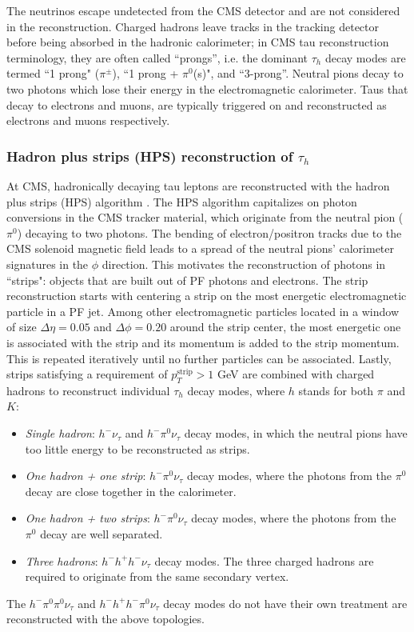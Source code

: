 The neutrinos escape undetected from the CMS detector and are not considered in the reconstruction. Charged hadrons leave tracks in the tracking detector before being absorbed in the hadronic calorimeter; in CMS tau reconstruction terminology, they are often called ``prongs'', i.e. the dominant $\tau_{h}$ decay modes are termed ``1 prong" ($\pi^\pm$), ``1 prong + $\pi^0$(s)", and ``3-prong''. Neutral pions decay to two photons which lose their energy in the electromagnetic calorimeter. Taus that decay to electrons and muons, are typically triggered on and reconstructed as electrons and muons respectively. 

\subsubsection{Hadron plus strips (HPS) reconstruction of \texorpdfstring{$\tau_{h}$}{tauh}}
At CMS, hadronically decaying tau leptons are reconstructed with the hadron plus strips (HPS) algorithm \citep{CMS-TAU-14-001} \cite{2012-JINST-7-P01001}. The HPS algorithm capitalizes on photon conversions in the CMS tracker material, which originate from the neutral pion ($\pi^0$) decaying to two photons. The bending of electron/positron tracks due to the CMS solenoid magnetic field leads to a spread of the neutral pions' calorimeter signatures in the $\phi$ direction. This motivates the reconstruction of photons in ``strips": objects that are built out of PF photons and electrons. The strip reconstruction starts with centering a strip on the most energetic electromagnetic particle in a PF jet. Among other electromagnetic particles located in a window of size $\Delta \eta = 0.05$ and $\Delta \phi = 0.20$ around the strip center, the most energetic one is associated with the strip and its momentum is added to the strip momentum. This is repeated iteratively until no further particles can be associated. Lastly, strips satisfying a requirement of $p_{T}^{\text{strip}} > 1$ GeV are combined with charged hadrons to reconstruct individual $\tau_{h}$ decay modes, where $h$ stands for both $\pi$ and $K$:
\begin{itemize}
    \item \textit{Single hadron}: $h^- \nu_{\tau}$ and $h^- \pi^0 \nu_{\tau}$ decay modes, in which the neutral pions have too little energy to be reconstructed as strips.
    \item \textit{One hadron + one strip}: $h^- \pi^0 \nu_{\tau}$ decay modes, where the photons from the $\pi^0$ decay are close together in the calorimeter.
    \item \textit{One hadron + two strips}: $h^- \pi^0 \nu_{\tau}$ decay modes, where the photons from the $\pi^0$ decay are well separated. 
    \item \textit{Three hadrons}: $h^- h^+ h^- \nu_{\tau}$ decay modes. The three charged hadrons are required to originate from the same secondary vertex.
\end{itemize}
The $h^- \pi^0 \pi^0 \nu_{\tau}$ and $h^- h^+ h^- \pi^0 \nu_{\tau}$ decay modes do not have their own treatment are reconstructed with the above topologies. 

